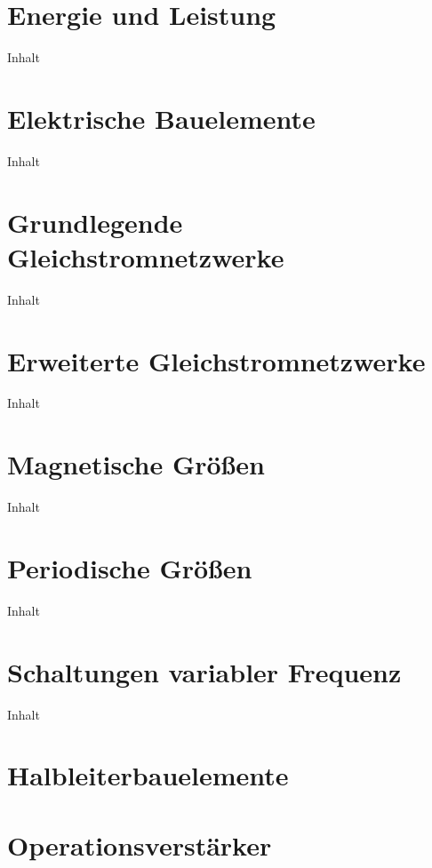 \documentclass[twoside, a4paper]{article}
\begin{document}
\cleardoublepage
\part{Energie und Leistung}
{Inhalt}

\cleardoublepage
\part{Elektrische Bauelemente}
{Inhalt}

\cleardoublepage
\part{Grundlegende Gleichstromnetzwerke}
{Inhalt}

\cleardoublepage
\part{Erweiterte Gleichstromnetzwerke}
{Inhalt}

\cleardoublepage
\part{Magnetische Größen}
{Inhalt}

\cleardoublepage
\part{Periodische Größen}
{Inhalt}

\cleardoublepage
\part{Schaltungen variabler Frequenz}
{Inhalt}

\cleardoublepage
\part{Halbleiterbauelemente}

\cleardoublepage
\part{Operationsverstärker}
\end{document}
